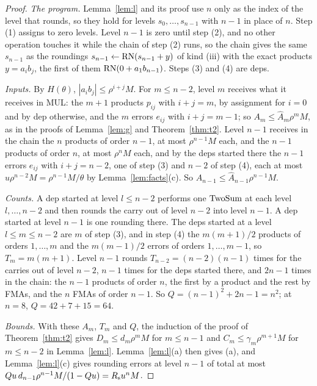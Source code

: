 \begin{proof}
\emph{The program.} Lemma~\ref{lem:l} and its proof use $n$ only as the index of the level that rounds, so they hold
for levels $s_0, \dots, s_{n-1}$ with $n-1$ in place of $n$. Step (1) assigns to zero levels. Level $n-1$ is zero
until step (2), and no other operation touches it while the chain of step (2) runs, so the chain gives the same
$s_{n-1}$ as the roundings $s_{n-1} \gets \mathrm{RN}(s_{n-1} + y)$ of kind (iii) with the exact products $y = a_ib_j$, the
first of them $\mathrm{RN}(0 + a_1b_{n-1})$. Steps (3) and (4) are deps.

\emph{Inputs.} By $H(\theta)$, $|a_ib_j| \le \rho^{i+j}M$. For $m \le n-2$, level $m$ receives what it receives in MUL:
the $m+1$ products $p_{ij}$ with $i+j = m$, by assignment for $i = 0$ and by dep otherwise, and the $m$ errors $e_{ij}$
with $i+j = m-1$; so $A_m \le \hat A_m\rho^mM$, as in the proofs of Lemma~\ref{lem:g} and Theorem~\ref{thm:t2}. Level $n-1$ receives in the
chain the $n$ products of order $n-1$, at most $\rho^{n-1}M$ each, and the $n-1$ products of order $n$, at most
$\rho^nM$ each, and by the deps started there the $n-1$ errors $e_{ij}$ with $i+j = n-2$, one of step (3) and $n-2$ of
step (4), each at most $u\rho^{n-2}M = \rho^{n-1}M/\theta$ by Lemma~\ref{lem:facts}(c). So $A_{n-1} \le
\hat A_{n-1}\rho^{n-1}M$.

\emph{Counts.} A dep started at level $l \le n-2$ performs one $\mathrm{TwoSum}$ at each level $l, \dots, n-2$ and then rounds
the carry out of level $n-2$ into level $n-1$. A dep started at level $n-1$ is one rounding there. The deps started at
a level $l \le m \le n-2$ are $m$ of step (3), and in step (4) the $m(m+1)/2$ products of orders $1, \dots, m$ and the
$m(m-1)/2$ errors of orders $1, \dots, m-1$, so $T_m = m(m+1)$. Level $n-1$ rounds $T_{n-2} = (n-2)(n-1)$ times for the
carries out of level $n-2$, $n-1$ times for the deps started there, and $2n-1$ times in the chain: the $n-1$ products
of order $n$, the first by a product and the rest by FMAs, and the $n$ FMAs of order $n-1$. So $Q = (n-1)^2 + 2n-1 =
n^2$; at $n = 8$, $Q = 42 + 7 + 15 = 64$.

\emph{Bounds.} With these $A_m$, $T_m$ and $Q$, the induction of the proof of Theorem~\ref{thm:t2} gives $D_m \le
d_m\rho^mM$ for $m \le n-1$ and $C_m \le \gamma_m\rho^{m+1}M$ for $m \le n-2$ in Lemma~\ref{lem:l}. Lemma~\ref{lem:l}(a)
then gives (a), and Lemma~\ref{lem:l}(c) gives rounding errors at level $n-1$ of total at most
$Qu\,d_{n-1}\rho^{n-1}M/(1-Qu) = R_{\rm s}u^nM$.


\end{proof}
